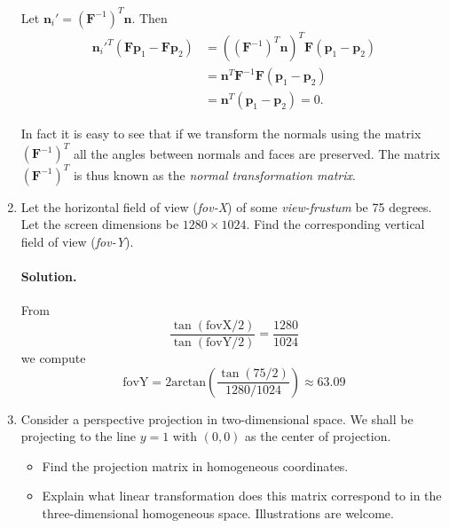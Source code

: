\documentclass{article}
\newcommand{\bn}{\mathbf{n}}
\newcommand{\bF}{\mathbf{F}}
\newcommand{\bp}{\mathbf{p}}
\begin{document}
\begin{enumerate}
Let $\bn_i' = (\bF^{-1})^T \bn$. Then
\begin{align*}
\bn_i'^T(\bF\bp_1 - \bF\bp_2) &= ((\bF^{-1})^T \bn)^T\bF(\bp_1 - \bp_2) \\
&= \bn^T\bF^{-1}\bF(\bp_1-\bp_2) \\
&= \bn^T(\bp_1-\bp_2) = 0.
\end{align*}

In fact it is easy to see that if we transform the normals using the matrix $(\bF^{-1})^T$ all the angles between normals and faces are preserved. The matrix $(\bF^{-1})^T$ is thus known as the \emph{normal transformation matrix}.



\item Let the horizontal field of view (\emph{fov-X}) of some \emph{view-frustum} be 75 degrees. Let the screen dimensions be $1280\times 1024$. Find the corresponding vertical field of view  (\emph{fov-Y}).

\paragraph{Solution.}
From
$$
\frac{\tan{(\text{fovX}/2)}}{\tan(\text{fovY}/2)} = \frac{1280}{1024}
$$
we compute
$$
\text{fovY} = 2\mathrm{arctan}\left(\frac{\tan(75/2)}{1280/1024}\right)\approx 63.09
$$

\item Consider a perspective projection in two-dimensional space. We shall be projecting to the line $y = 1$ with $(0, 0)$ as the center of projection.
\begin{itemize}
	\item Find the projection matrix in homogeneous coordinates.
	\item Explain what linear transformation does this matrix correspond to in the three-dimensional homogeneous space. Illustrations are welcome.
\end{itemize}

\end{enumerate}
\end{document}
